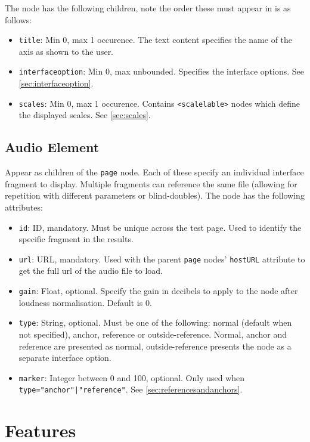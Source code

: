 \documentclass[11pt, oneside]{article}   	%
\begin{document}
        The node has the following children, note the order these must appear in is as follows:
        \begin{itemize}
            \item \texttt{title}: Min 0, max 1 occurence. The text content specifies the name of the axis as shown to the user.
            \item \texttt{interfaceoption}: Min 0, max unbounded. Specifies the interface options. See \ref{sec:interfaceoption}.
            \item \texttt{scales}: Min 0, max 1 occurence. Contains \texttt{<scalelable>} nodes which define the displayed scales. See \ref{sec:scales}.
        \end{itemize}

    \subsection{Audio Element}
    \label{sec:audioelement}
    Appear as children of the \texttt{page} node. Each of these specify an individual interface fragment to display. Multiple fragments can reference the same file (allowing for repetition with different parameters or blind-doubles). The node has the following attributes:
    \begin{itemize}
        \item \texttt{id}: ID, mandatory. Must be unique across the test page. Used to identify the specific fragment in the results.
        \item \texttt{url}: URL, mandatory. Used with the parent \texttt{page} nodes' \texttt{hostURL} attribute to get the full url of the audio file to load.
        \item \texttt{gain}: Float, optional. Specify the gain in decibels to apply to the node after loudness normalisation. Default is 0.
        \item \texttt{type}: String, optional. Must be one of the following: normal (default when not specified), anchor, reference or outside-reference. Normal, anchor and reference are presented as normal, outside-reference presents the node as a separate interface option.
        \item \texttt{marker}: Integer between 0 and 100, optional. Only used when \texttt{type="anchor"|"reference"}. See \ref{sec:referencesandanchors}.
    \end{itemize}


\section{Features}
\end{document}
